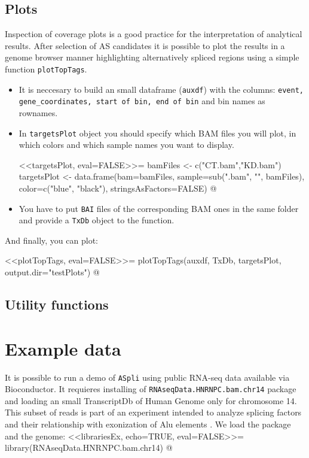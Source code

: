 \documentclass{article}
\begin{document}
\subsection{Plots}
Inspection of coverage plots is a good practice for the interpretation of analytical results. After selection of AS candidates it is possible to plot the results in a genome browser manner highlighting  alternatively spliced regions using a simple function \texttt{plotTopTags}.
\begin{itemize}
\item It is neccesary to build an small dataframe (\texttt{auxdf}) with the columns:
\texttt{event, gene\_coordinates, start of bin, end of bin} and bin names as rownames.
\item In \texttt{targetsPlot} object you should specify which BAM files you will plot, in which colors and which sample names you want to display. 

<<targetsPlot, eval=FALSE>>=
bamFiles <- c("CT.bam","KD.bam")
targetsPlot <- data.frame(bam=bamFiles, 
                        sample=sub(".bam", "", bamFiles), 
                        color=c("blue", "black"), 
                        stringsAsFactors=FALSE)
@
\item You have to put \texttt{BAI} files of the corresponding BAM ones in the same folder and provide a \texttt{TxDb} object to the function. 
\end{itemize}

And finally, you can plot:

<<plotTopTags, eval=FALSE>>=
plotTopTags(auxdf, 
            TxDb, 
            targetsPlot, 
            output.dir="testPlots")
@

\subsection{Utility functions}

\section{Example data}
It is possible to run a demo of \texttt{ASpli} using public RNA-seq data available via Bioconductor. It requieres installing of \texttt{RNAseqData.HNRNPC.bam.chr14} package and loading  an small TranscriptDb of Human Genome only for chromosome 14. This subset of reads is part of an experiment intended to analyze splicing factors and their relationship with exonization of Alu elements \cite{Zarnack2013453}. We load the package and the genome:
<<librariesEx, echo=TRUE, eval=FALSE>>=
library(RNAseqData.HNRNPC.bam.chr14)
@
\end{document}
